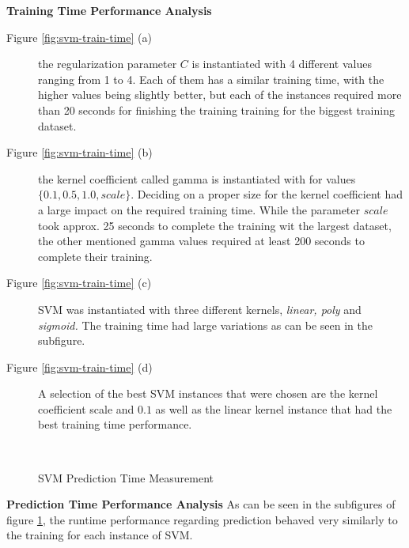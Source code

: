 \documentclass{article}[12pt]
\theoremstyle{mydef}
\begin{document}
            \textbf{Training Time Performance Analysis}
            \begin{description}
                \item[Figure \ref{fig:svm-train-time} (a)] the regularization parameter $C$ is instantiated with 4 different values ranging from 1 to 4.
                Each of them has a similar training time, with the higher values being slightly better, 
                but each of the instances required more than 20 seconds for finishing the training training for the biggest training dataset.
                \item[Figure \ref{fig:svm-train-time} (b)] the kernel coefficient called gamma is instantiated with for values $\{0.1, 0.5, 1.0, scale\}$. Deciding on a proper size for the kernel coefficient had a large impact on the required training time.
                    While the parameter $scale$ took approx. 25 seconds to complete the training wit the largest dataset, the other mentioned gamma values required at least 200 seconds to complete their training.
                \item[Figure \ref{fig:svm-train-time} (c)] SVM was instantiated with three different kernels, \emph{linear, poly} and \emph{sigmoid.} The training time had large variations as can be seen in the subfigure.
                \item[Figure \ref{fig:svm-train-time} (d)] A selection of the best SVM instances that were chosen are the kernel coefficient scale and $0.1$ as well as the linear kernel instance that had the best training time performance.
            \end{description}
            \begin{figure}[!h]
                \centering
                \quad
                    \\
                    \quad
                    \caption{SVM Prediction Time Measurement}
                    \label{fig:svm-predict-time}
                \end{figure}
            \textbf{Prediction Time Performance Analysis}
            As can be seen in the subfigures of figure \ref{fig:svm-predict-time}, the runtime performance regarding prediction behaved very similarly to the training for each instance of SVM.
\end{document}
